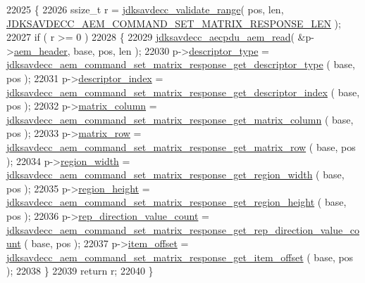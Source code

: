 \begin{DoxyCode}
22025 \{
22026     ssize\_t r = \hyperlink{group__util_ga9c02bdfe76c69163647c3196db7a73a1}{jdksavdecc\_validate\_range}( pos, len, 
      \hyperlink{group__command__set__matrix__response_ga2e35d80d27f6e6764556c6a0f3486f78}{JDKSAVDECC\_AEM\_COMMAND\_SET\_MATRIX\_RESPONSE\_LEN} );
22027     \textcolor{keywordflow}{if} ( r >= 0 )
22028     \{
22029         \hyperlink{group__aecpdu__aem_gae2421015dcdce745b4f03832e12b4fb6}{jdksavdecc\_aecpdu\_aem\_read}( &p->\hyperlink{structjdksavdecc__aem__command__set__matrix__response_ae1e77ccb75ff5021ad923221eab38294}{aem\_header}, base, pos, len );
22030         p->\hyperlink{structjdksavdecc__aem__command__set__matrix__response_ab7c32b6c7131c13d4ea3b7ee2f09b78d}{descriptor\_type} = 
      \hyperlink{group__command__set__matrix__response_gaaaaefffb49fea0ed3079d21a5fc05690}{jdksavdecc\_aem\_command\_set\_matrix\_response\_get\_descriptor\_type}
      ( base, pos );
22031         p->\hyperlink{structjdksavdecc__aem__command__set__matrix__response_a042bbc76d835b82d27c1932431ee38d4}{descriptor\_index} = 
      \hyperlink{group__command__set__matrix__response_ga5775a3ade1a18bc00c578a8071349df0}{jdksavdecc\_aem\_command\_set\_matrix\_response\_get\_descriptor\_index}
      ( base, pos );
22032         p->\hyperlink{structjdksavdecc__aem__command__set__matrix__response_aa7db0d3d8cd5b895d1f9bf81b816fd66}{matrix\_column} = 
      \hyperlink{group__command__set__matrix__response_ga90cf3cd8bdb1bbf14c48d7ad650195cf}{jdksavdecc\_aem\_command\_set\_matrix\_response\_get\_matrix\_column}
      ( base, pos );
22033         p->\hyperlink{structjdksavdecc__aem__command__set__matrix__response_a8cb269dcca919ec8232ec33a09477c07}{matrix\_row} = 
      \hyperlink{group__command__set__matrix__response_gafa23da957d106f88f1ffcc7d56eb2330}{jdksavdecc\_aem\_command\_set\_matrix\_response\_get\_matrix\_row}
      ( base, pos );
22034         p->\hyperlink{structjdksavdecc__aem__command__set__matrix__response_a87453b735ebc871f58f507139df28b89}{region\_width} = 
      \hyperlink{group__command__set__matrix__response_ga630205a6f85c06c9816b2b3c912f110f}{jdksavdecc\_aem\_command\_set\_matrix\_response\_get\_region\_width}
      ( base, pos );
22035         p->\hyperlink{structjdksavdecc__aem__command__set__matrix__response_afac2ca21b44ee4f90b555f2609321c60}{region\_height} = 
      \hyperlink{group__command__set__matrix__response_ga383ad21afe7fccfd0e6656ec5df5d9c6}{jdksavdecc\_aem\_command\_set\_matrix\_response\_get\_region\_height}
      ( base, pos );
22036         p->\hyperlink{structjdksavdecc__aem__command__set__matrix__response_ad43e01e546f8431400084a400bc17c47}{rep\_direction\_value\_count} = 
      \hyperlink{group__command__set__matrix__response_ga4c517fd6f384a10d7b5cf5642726d6e5}{jdksavdecc\_aem\_command\_set\_matrix\_response\_get\_rep\_direction\_value\_count}
      ( base, pos );
22037         p->\hyperlink{structjdksavdecc__aem__command__set__matrix__response_afbb15486d86fc9c3680a6864ddbc029b}{item\_offset} = 
      \hyperlink{group__command__set__matrix__response_ga1617695deb39c26860a110e64d19bb09}{jdksavdecc\_aem\_command\_set\_matrix\_response\_get\_item\_offset}
      ( base, pos );
22038     \}
22039     \textcolor{keywordflow}{return} r;
22040 \}
\end{DoxyCode}


